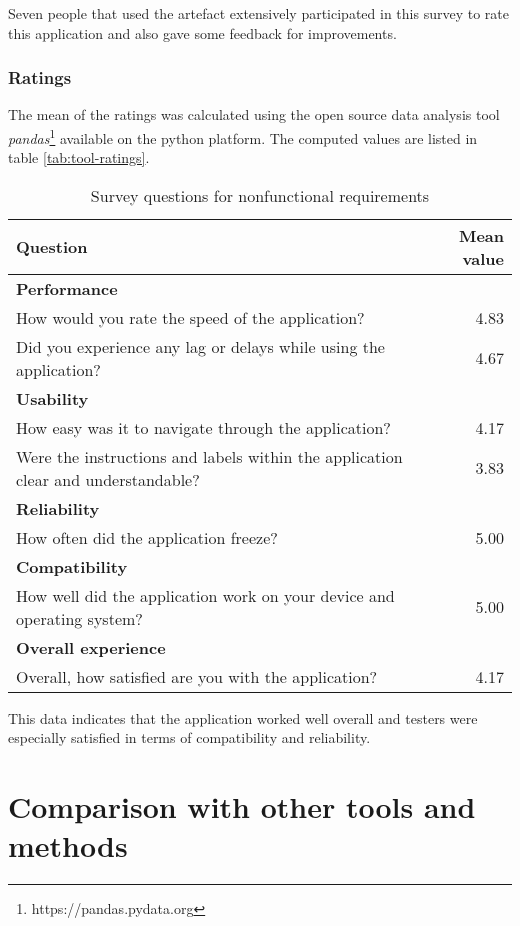 Seven people that used the artefact extensively participated in this survey to rate this application and also gave some feedback for improvements.

\subsubsection{Ratings}

The mean of the ratings was calculated using the open source data analysis tool \textit{pandas}\footnote{https://pandas.pydata.org} available on the python platform. The computed values are listed in table \ref{tab:tool-ratings}.


\begin{table}[!h]
    \centering
    \begin{tabular}{p{8cm} r}
    \hline
        \textbf{Question} & \textbf{Mean value} \\ 
     \hline
        \textbf{Performance} & \\
        How would you rate the speed of the application? & 4.83 \\
        Did you experience any lag or delays while using the application? & 4.67 \\
     \hline
        \textbf{Usability} & \\
        How easy was it to navigate through the application? & 4.17\\
        Were the instructions and labels within the application clear and understandable? & 3.83 \\
     \hline
        \textbf{Reliability} & \\
        How often did the application freeze? & 5.00 \\
     \hline
        \textbf{Compatibility} & \\
        How well did the application work on your device and operating system? & 5.00 \\
     \hline
        \textbf{Overall experience} & \\
        Overall, how satisfied are you with the application? & 4.17 \\
        
    \end{tabular}
    \caption{Survey questions for nonfunctional requirements}
    \label{tab:non-func-req}
\end{table}

This data indicates that the application worked well overall and testers were especially satisfied in terms of compatibility and reliability. 

\section{Comparison with other tools and methods}
